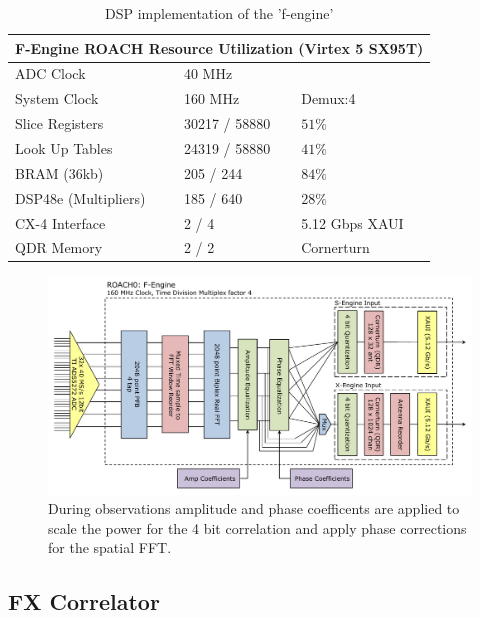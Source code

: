 \documentclass[useAMS,macros,usenatbib,onecolumn]{mn2e}
\begin{document}
\begin{table}
\begin{center}
\begin{tabular}{| l | l | l |}
\hline
\multicolumn{3}{|c|}{F-Engine ROACH Resource Utilization (Virtex 5 SX95T)}\\
\hline
ADC Clock 		& 40 MHz \\
System Clock 		& 160 MHz 	& Demux:4 \\
Slice Registers 	& 30217 / 58880 & $51\%$\\
Look Up Tables 		& 24319 / 58880 & $41\%$\\
BRAM (36kb) 		& 205 / 244 	& $84\%$\\
DSP48e (Multipliers) 	& 185 / 640 	& $28\%$\\
CX-4 Interface 		& 2 / 4 	& 5.12 Gbps XAUI\\
QDR Memory 		& 2 / 2 	& Cornerturn\\
\hline
\end{tabular}
\caption{DSP implementation of the 'f-engine'}
\label{tbl:feng_resource}
\end{center}
\end{table}

\begin{figure}
    \centering
    \includegraphics[scale=0.6]{graphics/crop_fengine_block.pdf}
    \caption{During observations amplitude and phase coefficents are applied to scale the power for the 4 bit correlation and apply phase corrections for the spatial FFT.}
    \label{fig:feng_block}
\end{figure}

\subsection{FX Correlator}
\label{correlator}
\end{document}
